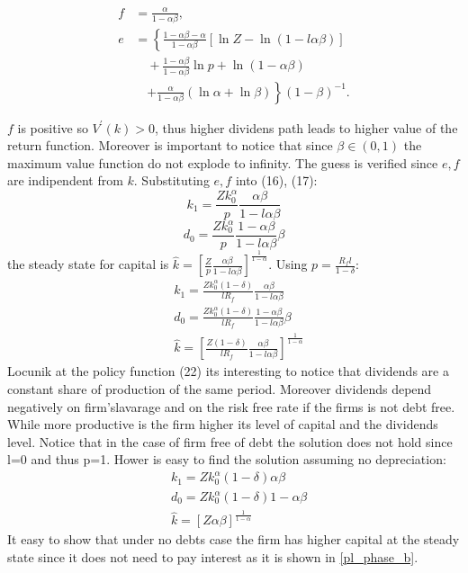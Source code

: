 \documentclass[12pt]{article}
\begin{document}
\begin{align}
    f &= \frac{\alpha}{1 - \alpha \beta},\\
    e &= \left\{\frac{1 - \alpha \beta - \alpha}{1 - \alpha \beta}\left[\ln Z - \ln\left(1 - l\alpha \beta\right)\right] \right. \nonumber \\
      &\quad + \frac{1 - \alpha \beta}{1 - \alpha \beta} \ln p + \ln\left(1 - \alpha \beta\right) \nonumber \\
      &\quad \left. + \frac{\alpha}{1 - \alpha \beta} (\ln \alpha + \ln \beta) \right\}(1 - \beta)^{-1}.
\end{align}




\(f\) is positive so \(V^{\prime}(k)>0 \), thus higher dividens path leads to higher value of the return function.
Moreover is important to notice that since \(\beta \in (0,1)\) the maximum value function do not explode to infinity.
The guess is verified since \(e,f\) are indipendent from \(k\). Substituting \(e,f\) into (16), (17):
\[k_1 = \frac{Z k_0^{\alpha}}{p}\frac{\alpha\beta}{1-l\alpha\beta}\]
\[d_0 = \frac{Z k_0^{\alpha}}{p}\frac{1-\alpha\beta}{1-l\alpha\beta}\beta\]
the steady state for capital is
\(\widehat{k}=\left[\frac{Z}{p}\frac{\alpha\beta}{1-l\alpha\beta}\right]^{\frac{1}{1-\alpha}} \). Using \(p =\frac{R_f
l}{1-\delta} \):
\begin{align}
    &k_1 = \frac{Z k_0^{\alpha}{\left(1-\delta\right)}}{l R_f}\frac{\alpha\beta}{1-l\alpha\beta} \\
    &d_0 = \frac{Z k_0^{\alpha}{\left(1-\delta\right)}}{l R_f}\frac{1-\alpha\beta}{1-l\alpha\beta}\beta \\
    & \widehat{k}=\left[\frac{Z  {\left(1-\delta\right)}}{l R_f}\frac{\alpha\beta}{1-l\alpha\beta}\right]^{\frac{1}{1-\alpha}}
\end{align}
Locunik at the policy function (22) its interesting to notice that dividends are a constant share of production of the
same period. Moreover dividends depend negatively on firm'slavarage and on the risk free rate if the firms is not debt
free. While more productive is the firm higher its level of capital and the dividends level. Notice that in the case of
firm free of debt the solution does not hold since l=0 and thus p=1. Hower is easy to find the solution assuming no
depreciation:
\begin{align}
    &k_1 = {Z k_0^{\alpha} {\left(1-\delta\right)}}{\alpha\beta} \\
    &d_0 = {Z k_0^{\alpha}{\left(1-\delta\right)}}{1-\alpha\beta} \\
    & \widehat{k}=\left[{Z}{\alpha\beta}\right]^{\frac{1}{1-\alpha}}
\end{align}
It easy to show that under no debts case the firm has higher capital at the steady state since it does not need to pay
interest as it is shown in \ref{pl_phase_b}.
\end{document}
